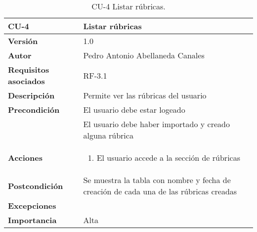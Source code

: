 \begin{table}[p]
	\centering
	\begin{tabularx}{\linewidth}{ p{} p{} }
		\toprule
		\textbf{CU-4}    & \textbf{Listar rúbricas} \\
		\midrule
		\textbf{Versión}              & 1.0    \\
		\textbf{Autor}                & Pedro Antonio Abellaneda Canales \\
		\textbf{Requisitos asociados} & RF-3.1 \\
		\textbf{Descripción}          & Permite ver las rúbricas del usuario \\
		\textbf{Precondición}         & El usuario debe estar logeado \\ & El usuario debe haber importado y creado alguna rúbrica \\
		\textbf{Acciones}             &
		\begin{enumerate}
			\def\labelenumi{\arabic{enumi}.}
			\tightlist
			\item El usuario accede a la sección de rúbricas

		\end{enumerate} \\
		\textbf{Postcondición}        & Se muestra la tabla con nombre y fecha de creación de cada una de las rúbricas creadas\\ 
		\textbf{Excepciones}          & \\ 
		\textbf{Importancia}          & Alta \\
		\bottomrule
	\end{tabularx}
	\caption{CU-4 Listar rúbricas.}
	\label{tab:CU-4}
\end{table}

